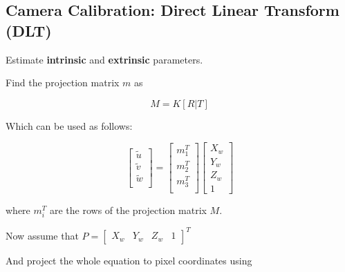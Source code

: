 \documentclass[10pt,a4paper]{scrartcl}
\begin{document}
\begin{multicols*}{2}
\begin{enumerate}
\end{enumerate}

\subsection{Camera Calibration: Direct Linear Transform (DLT)} \label{sec:DLT}

Estimate \textbf{intrinsic} and \textbf{extrinsic} parameters.

Find the projection matrix $m$ as

\begin{equation*}
M = K[R|T]
\end{equation*}

Which can be used as follows:

\begin{equation*}
\begin{bmatrix}
\tilde{u}\\
\tilde{v}\\
\tilde{w}\\
\end{bmatrix}=
\begin{bmatrix}
m_1^T\\
m_2^T\\
m_3^T\\
\end{bmatrix}
\begin{bmatrix}
X_w\\
Y_w\\
Z_w\\
1
\end{bmatrix}
\end{equation*}

where $m_i^T$ are the rows of the projection matrix $M$.

Now assume that $P=\begin{bmatrix}
X_w&Y_w&Z_w&1
\end{bmatrix}^T$

And project the whole equation to pixel coordinates using



\end{multicols*}
\end{document}
